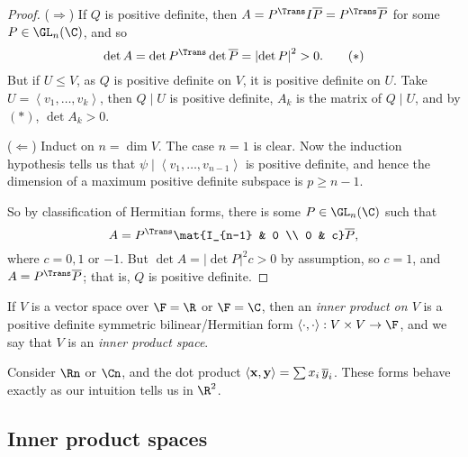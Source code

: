 	\pagebreak

\begin{proof}
	($\Rightarrow$) If $Q$ is positive definite, then $A=P^\Trans I\overline{P} = P^\Trans \overline{P}$ for some $P\in\GL_n(\C)$, and so %
	\begin{equation*}
		\det A = \det P^\Trans \det \overline{P} = \left\vert \det P \right\vert^2 > 0. \tag{$*$} %
	\end{equation*}
	But if $U\leq V$, as $Q$ is positive definite on $V$, it is positive definite on $U$. Take $U=\left\langle v_1,\ldots,v_k \right\rangle$, then $Q\mid U$ is positive definite, $A_k$ is the matrix of $Q \mid U$, and by $(*)$, $\det A_k > 0$. %
	
	($\Leftarrow$) Induct on $n=\dim V$. The case $n=1$ is clear. Now the induction hypothesis tells us that $\psi \mid \left\langle v_1,\ldots,v_{n-1} \right\rangle$ is positive definite, and hence the dimension of a maximum positive definite subspace is $p\geq n-1$. %
	
	So by classification of Hermitian forms, there is some $P\in\GL_n(\C)$ such that
	\begin{equation*}
		A = P^\Trans \mat{I_{n-1} & 0 \\ 0 & c} \overline{P},
	\end{equation*}
	where $c=0,1$ or $-1$. But $\det A = \left\vert \det P \right\vert^2 c > 0$ by assumption, so $c=1$, and $A=P^\Trans \overline{P}$; that is, $Q$ is positive definite. %
\end{proof}

\begin{definition}
	If $V$ is a vector space over $\F = \R$ or $\F =\C$, then an \emph{inner product on $V$} is a positive definite symmetric bilinear/Hermitian form $\left\langle \cdot,\cdot \right\rangle:V\times V \to\F$, and we say that $V$ is an \emph{inner product space}. %
\end{definition}

\begin{example}
	Consider $\Rn$ or $\Cn$, and the dot product $\left\langle \bf{x},\bf{y} \right\rangle = \sum x_i\,\overline{y}_i$. These forms behave exactly as our intuition tells us in $\R^2$. %
\end{example}

\subsection{Inner product spaces} %
\label{sub:inner_product_spaces}


